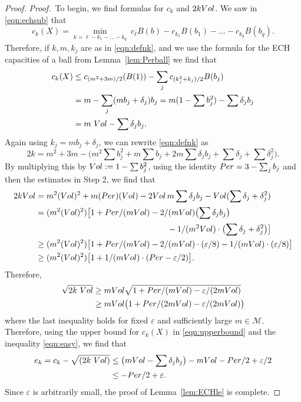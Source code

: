 \documentclass[10pt,a4paper]{amsart}
\newcommand{\Mm}{{\mathcal M}}
\newcommand{\NI}{{\noindent}}
\newcommand{\Per}{{\rm Per}}
\newcommand{\Vol}{{\rm Vol}}
\newcommand{\de}{{\delta}}
\newcommand{\eps}{\varepsilon}
\begin{document}
\begin{proof}
\NI {\it Proof.}\
To begin, we find formulas for $c_k$ and $2k \Vol$.
We
 saw in \eqref{eqn:echsub}  that
\begin{equation}
\label{eqn:echsub0}
c_k(X) = \min_{k = \ell - k_1 - \ldots - k_q}\ c_\ell B(b) - c_{k_1} B(b_1) - \ldots - c_{k_q} B(b_q).
\end{equation}
Therefore, if $k,m,k_j$ are as in \eqref{eqn:defnk}, and we use 
 the formula for the ECH capacities of a ball from Lemma~\ref{lem:Perball} we find that
\begin{align}
\label{eqn:upperbound}
c_k(X) &\le c_{(m^2 + 3m)/2}(B(1)) - \sum_j c_{ (k_j^2 + k_j)/2} B(b_j)\\ \notag
 & = m - \sum_j (m b_j+ \delta_j) b_j 
 = m(1 - \sum b_j^2) - \sum \delta_j b_j \\  \notag
 &= m\ \Vol - \sum \delta_j b_j.
\end{align}
Again using $k_j = m b_j+ \delta_j$, we can rewrite \eqref{eqn:defnk} as
\[ 
2k = m^2 + 3m - \bigl(m^2 \sum  b_j^2 + m \sum b_j + 2m \sum \delta_j b_j + \sum \delta_j + \sum \delta_j^2\bigr).\]
By multiplying this by $\Vol: = 1-\sum b_j^2$, using the identity $ \Per = 3- \sum_j b_j$ and then the estimates in Step 2,  we find that
\begin{align*}\notag 2k\Vol &= m^2 (\Vol)^2 + m (\Per)(\Vol) - 2\Vol \, m \sum \delta_j b_j - \Vol( \sum \delta_j + \delta_j^2)
\\ 
&= (m^2(\Vol)^2)\bigl[ 1 + \Per/(m\Vol) - 2/(m\Vol) \bigl(\sum \delta_j b_j\bigr)\\
&\notag\qquad\qquad  \qquad\qquad \qquad\qquad\qquad\qquad   - 1/(m^2\Vol)\cdot \bigl( \sum \delta_j + \delta_j^2\bigr) \bigr]\\ \notag
& \ge (m^2(\Vol)^2)\bigl[ 1 + \Per/(m\Vol) - 2/(m\Vol)\cdot ( \eps/8) - 1/(m\Vol)\cdot (\eps/8)\bigr] \\ \notag
& \ge (m^2(\Vol)^2)\bigl[ 1 + 1/(m\Vol)\cdot (\Per -  \eps/2)\bigr].
\end{align*}
Therefore, 
\begin{align*}
\sqrt{2k\ \Vol} &\ge m\Vol \sqrt {1 + \Per/(m\Vol) - \eps/(2m\Vol)}\\
&  \ge m\Vol\bigl(1 +  \Per/(2m\Vol) - \eps/(2m\Vol)\bigr)
\end{align*}
where the last inequality holds for fixed $\eps$ and sufficiently large $m\in \Mm$.
Therefore, using the upper bound for $c_k(X)$ in \eqref{eqn:upperbound} and the inequality
\eqref{eqn:easy}, we find that
\begin{align*} e_k  = c_k - \sqrt{(2k\ \Vol)} &\le \bigl(m\Vol  - \sum \de_j b_j \bigr) - m\Vol - \Per/2 + \eps/2   \\
& \le  - \Per/2 + \eps.
\end{align*}
Since $\eps$ is arbitrarily small,  the proof of Lemma~\ref{lem:ECHle}  is complete.
\end{proof}
\end{document}
